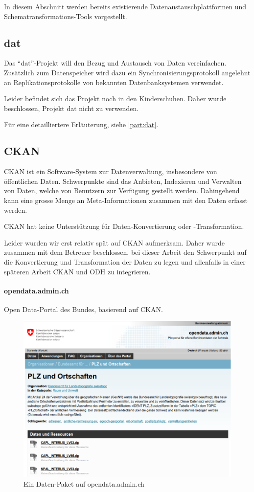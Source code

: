 In diesem Abschnitt werden bereits existierende Datenaustauschplattformen und Schematransformations-Tools vorgestellt.

\subsection{dat}
Das ``dat''-Projekt will den Bezug und Austausch von Daten vereinfachen. Zusätzlich zum Datenspeicher wird dazu ein Synchronisierungsprotokoll angelehnt an Replikationsprotokolle von bekannten Datenbanksystemen verwendet.

Leider befindet sich das Projekt noch in den Kinderschuhen. Daher wurde beschlossen, Projekt dat nicht zu verwenden.

Für eine detailliertere Erläuterung, siehe \cref{part:dat}.

\subsection{CKAN}
CKAN ist ein Software-System zur Datenverwaltung, insbesondere von öffentlichen Daten. Schwerpunkte sind das Anbieten, Indexieren und Verwalten von Daten, welche von Benutzern zur Verfügung gestellt werden. Dahingehend kann eine grosse Menge an Meta-Informationen zusammen mit den Daten erfasst werden. 

CKAN hat keine Unterstützung für Daten-Konvertierung oder -Transformation.

Leider wurden wir erst relativ spät auf CKAN aufmerksam. Daher wurde zusammen mit dem Betreuer beschlossen, bei dieser Arbeit den Schwerpunkt auf die Konvertierung und Transformation der Daten zu legen und allenfalls in einer späteren Arbeit CKAN und ODH zu integrieren.

\paragraph{opendata.admin.ch}
Open Data-Portal des Bundes, basierend auf CKAN.

\begin{figure}[H]
    \centering
    \includegraphics[width=2\linewidth/3]{fig/opendata-admin-ch}
    \caption{Ein Daten-Paket auf opendata.admin.ch}
\end{figure}

